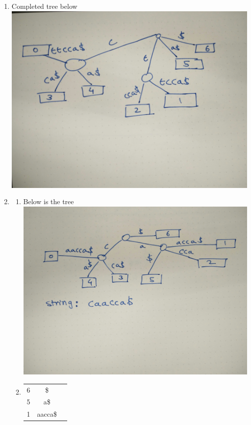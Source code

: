 \documentclass[12pt]{article}
\begin{document}
\begin{enumerate}
\begin{enumerate}[label=(\alph*)]
\end{enumerate}
\item  Completed tree below \\ \includegraphics[scale=0.064]{4}
\item 
    \begin{enumerate}
        \item Below is the tree \\\includegraphics[scale=0.09]{5a}
        \item
            \begin{tabular}{ |c|c|c| } 
             \hline
             6 & \$\\
             5 & a\$\\
             1 & aacca\$\\

\end{tabular}
\end{enumerate}
\end{enumerate}
\end{document}
